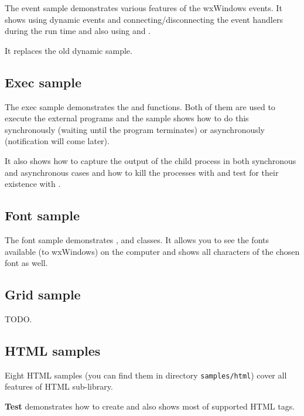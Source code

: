 The event sample demonstrates various features of the wxWindows events. It
shows using dynamic events and connecting/disconnecting the event handlers
during the run time and also using 
 and
.

It replaces the old dynamic sample.

\subsection{Exec sample}\label{sampleexec}

The exec sample demonstrates the  and 
 functions. Both of them are used to execute the
external programs and the sample shows how to do this synchronously (waiting
until the program terminates) or asynchronously (notification will come later).

It also shows how to capture the output of the child process in both
synchronous and asynchronous cases and how to kill the processes with 
 and test for their existence with 
.

\subsection{Font sample}\label{samplefont}

The font sample demonstrates , 
 and 
 classes. It allows you to see the fonts
available (to wxWindows) on the computer and shows all characters of the
chosen font as well.

\subsection{Grid sample}\label{samplegrid}

TODO.

\subsection{HTML samples}\label{samplehtml}

Eight HTML samples (you can find them in directory {\tt samples/html})
cover all features of HTML sub-library.

{\bf Test} demonstrates how to create  
and also shows most of supported HTML tags.

